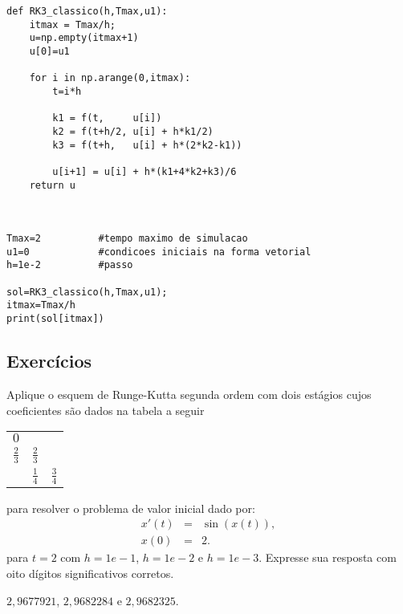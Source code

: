 \begin{exeresol}
\begin{verbatim}
def RK3_classico(h,Tmax,u1):
  	itmax = Tmax/h;
	u=np.empty(itmax+1)
	u[0]=u1
	
	for i in np.arange(0,itmax):
		t=i*h

		k1 = f(t,     u[i])
		k2 = f(t+h/2, u[i] + h*k1/2)
		k3 = f(t+h,   u[i] + h*(2*k2-k1))

		u[i+1] = u[i] + h*(k1+4*k2+k3)/6
	return u


	
Tmax=2			#tempo maximo de simulacao
u1=0			#condicoes iniciais na forma vetorial
h=1e-2			#passo

sol=RK3_classico(h,Tmax,u1);
itmax=Tmax/h
print(sol[itmax])
\end{verbatim}

\fi
 
\end{exeresol}

\subsection*{Exercícios}
\begin{exer} Aplique o esquem de Runge-Kutta segunda ordem com dois estágios cujos coeficientes são dados na tabela a seguir
 \begin{tabular}{c|cc}
  $0$ &   &   \\
  $\frac{2}{3}$ & $\frac{2}{3}$ &   \\  \hline
    & $\frac{1}{4}$ & $\frac{3}{4}$
\end{tabular}
para resolver o problema de valor inicial dado por:
\begin{eqnarray*}
x'(t)&=&\sin(x(t)),\\
x(0)&=&2.
\end{eqnarray*}
para $t=2$ com $h=1e-1$, $h=1e-2$ e $h=1e-3$. Expresse sua resposta com oito dígitos significativos corretos.
\end{exer}
\begin{resp}
 $2,9677921$, $2,9682284$ e $2,9682325$.
\end{resp}

\begin{exer}
 
\end{exer}



